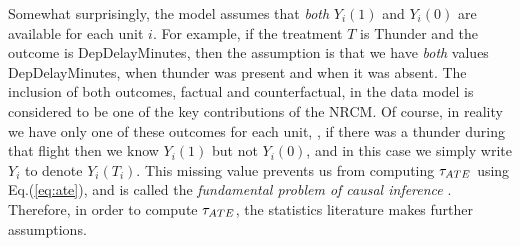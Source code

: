 Somewhat surprisingly, the model assumes that {\em both} $Y_i(1)$ and
$Y_i(0)$ are available for each unit $i$.  For example, if the
treatment $T$ is Thunder and the outcome is DepDelayMinutes, then the
assumption is that we have {\em both} values DepDelayMinutes, when
thunder was present and when it was absent.  The inclusion of both
outcomes, factual and counterfactual, in the data model is considered
to be one of the key contributions of the NRCM.
Of course, in reality we have only one of these outcomes for each
unit, \eg, if there was a thunder during that flight then we know
$Y_i(1)$ but not $Y_i(0)$, and in this case we simply write $Y_i$ to
denote $Y_i(T_i)$.  This missing value prevents us from computing
${\tau_{ATE}}$ using Eq.(\ref{eq:ate}), and is called the {\em fundamental
  problem of causal inference} \cite{Holland1986}.  Therefore, in
order to compute ${\tau_{ATE}}$, the statistics literature makes further
assumptions.


\vspace{-0.3cm}
